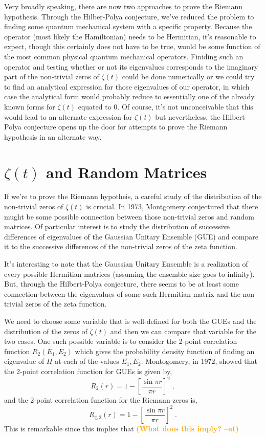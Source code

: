 \documentclass{amsproc}
\newcommand{\at}[1]{\textbf{\textcolor{orange}{(#1 --at)}}}
\theoremstyle{definition}
\theoremstyle{remark}
\numberwithin{equation}{section}
\begin{document}
Very broadly speaking, there are now two approaches to prove the Riemann hypothesis. Through the Hilber-Polya conjecture, we've reduced the problem to finding some quantum mechanical system with a specific property. Because the operator (most likely the Hamiltonian) needs to be Hermitian, it's reasonable to expect, though this certainly does not have to be true, would be some function of the most common physical quantum mechanical operators. Finiding such an operator and testing whether or not its eigenvalues corresponds to the imaginary part of the non-trivial zeros of $\zeta(t)$ could be done numerically or we could try to find an analytical expression for those eigenvalues of our operator, in which case the analytical form would probably reduce to essentially one of the already known forms for $\zeta(t)$ equated to 0. Of course, it's not unconceivable that this would lead to an alternate expression for $\zeta(t)$ but nevertheless, the Hilbert-Polya conjecture opens up the door for attempts to prove the Riemann hypothesis in an alternate way. 


\section{$\zeta(t)$ and Random Matrices}
If we're to prove the Riemann hypotheis, a careful study of the distribution of the non-trivial zeros of $\zeta(t)$ is crucial. In 1973, Montgomery conjectured that there mught be some possible connection between those non-trivial zeros and random matrices. Of particular interest is to study the distribution of successive differences of eigenvalues of the Gaussian Unitary Ensemble (GUE) and compare it to the successive differences of the non-trivial zeros of the zeta function. 

It's interesting to note that the Gaussian Unitary Ensemble is a realization of every possible Hermitian matrices (assuming the ensemble size goes to infinity). But, through the Hilbert-Polya conjecture, there seems to be at least some connection between the eigenvalues of some such Hermitian matrix and the non-trivial zeros of the zeta function. 

We need to choose some variable that is well-defined for both the GUEs and the distribution of the zeros of $\zeta(t)$ and then we can compare that variable for the two cases. One such possible variable is to consider the 2-point correlation function $R_2(E_1, E_2)$ which gives the probability density function of finding an eigenvalue of $H$ at each of the values $E_1, E_2$.  Montogomery, in 1972, showed that the 2-point correlation function for GUEs is given by,
$$
R_2(r) = 1 - \left[ \frac{ \sin{\pi r} }{\pi r} \right]^2 \;,
$$
and the 2-point correlation function for the Riemann zeros is, 
$$
R_{\zeta, 2}(r) = 1 - \left[ \frac{ \sin{\pi r} }{\pi r} \right]^2 \;.
$$
This is remarkable since this implies that \at{What does this imply?}
\end{document}
